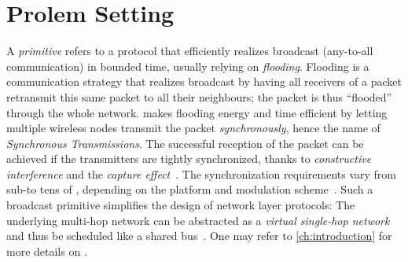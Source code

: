 
\section{Prolem Setting}
\label{sec:baloo_intro}


A \textsl{\ST primitive} refers to a protocol that efficiently realizes broadcast (\ie any-to-all communication) in bounded time, usually relying on \textsl{flooding}.
Flooding is a communication strategy that realizes broadcast by having all receivers of a packet retransmit this same packet to all their neighbours; the packet is thus ``flooded'' through the whole network. \ST makes flooding energy and time efficient by letting multiple wireless nodes transmit the packet \textsl{synchronously}, hence the name of \textsl{Synchronous Transmissions}. The successful reception of the packet can be achieved if the transmitters are tightly synchronized, thanks to \textsl{constructive interference} and the \textsl{capture effect}~\cite{yuan2013LetTalkTogether}.
The synchronization requirements vary from sub-\us to tens of \us, depending on the platform and modulation scheme~\cite{yuan2013LetTalkTogether}.
Such a broadcast primitive simplifies the design of network layer protocols: The underlying multi-hop network can be abstracted as a \textsl{virtual single-hop network} and thus be scheduled like a shared bus~\cite{ferrari2012LWB}.
One may refer to \cref{ch:introduction} for more details on \ST.

